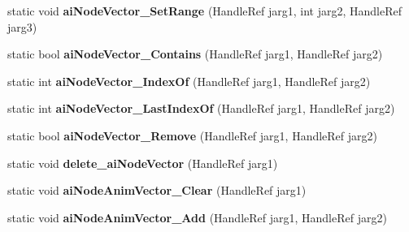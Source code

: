 \begin{DoxyCompactItemize}
\item 
\hypertarget{class_assimp_p_i_n_v_o_k_e_abcd7d1118b2f77228fcaed31b5d2ddaa}{static void {\bfseries ai\+Node\+Vector\+\_\+\+Set\+Range} (Handle\+Ref jarg1, int jarg2, Handle\+Ref jarg3)}\label{class_assimp_p_i_n_v_o_k_e_abcd7d1118b2f77228fcaed31b5d2ddaa}

\item 
\hypertarget{class_assimp_p_i_n_v_o_k_e_a10dcad4856ccf3c5d91c6a3a41b352f5}{static bool {\bfseries ai\+Node\+Vector\+\_\+\+Contains} (Handle\+Ref jarg1, Handle\+Ref jarg2)}\label{class_assimp_p_i_n_v_o_k_e_a10dcad4856ccf3c5d91c6a3a41b352f5}

\item 
\hypertarget{class_assimp_p_i_n_v_o_k_e_aad3ecec70ff222d3bf5097d5729761a3}{static int {\bfseries ai\+Node\+Vector\+\_\+\+Index\+Of} (Handle\+Ref jarg1, Handle\+Ref jarg2)}\label{class_assimp_p_i_n_v_o_k_e_aad3ecec70ff222d3bf5097d5729761a3}

\item 
\hypertarget{class_assimp_p_i_n_v_o_k_e_ab524c175f6bf28673c5ee9819e016234}{static int {\bfseries ai\+Node\+Vector\+\_\+\+Last\+Index\+Of} (Handle\+Ref jarg1, Handle\+Ref jarg2)}\label{class_assimp_p_i_n_v_o_k_e_ab524c175f6bf28673c5ee9819e016234}

\item 
\hypertarget{class_assimp_p_i_n_v_o_k_e_a1721b906327963ecdcef9ffc8a0c463d}{static bool {\bfseries ai\+Node\+Vector\+\_\+\+Remove} (Handle\+Ref jarg1, Handle\+Ref jarg2)}\label{class_assimp_p_i_n_v_o_k_e_a1721b906327963ecdcef9ffc8a0c463d}

\item 
\hypertarget{class_assimp_p_i_n_v_o_k_e_a7f5dee732ebc93103bd967dc1442977c}{static void {\bfseries delete\+\_\+ai\+Node\+Vector} (Handle\+Ref jarg1)}\label{class_assimp_p_i_n_v_o_k_e_a7f5dee732ebc93103bd967dc1442977c}

\item 
\hypertarget{class_assimp_p_i_n_v_o_k_e_af3aabba10a29a66fe5e90b96190583ac}{static void {\bfseries ai\+Node\+Anim\+Vector\+\_\+\+Clear} (Handle\+Ref jarg1)}\label{class_assimp_p_i_n_v_o_k_e_af3aabba10a29a66fe5e90b96190583ac}

\item 
\hypertarget{class_assimp_p_i_n_v_o_k_e_a81f0d81cbf5409583ad4885bd72f5845}{static void {\bfseries ai\+Node\+Anim\+Vector\+\_\+\+Add} (Handle\+Ref jarg1, Handle\+Ref jarg2)}\label{class_assimp_p_i_n_v_o_k_e_a81f0d81cbf5409583ad4885bd72f5845}


\end{DoxyCompactItemize}
